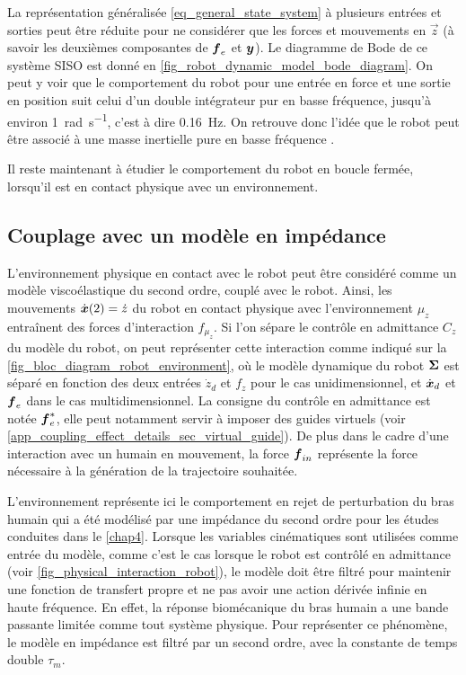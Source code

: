 La représentation généralisée \cref{eq_general_state_system} à plusieurs entrées et sorties peut être réduite pour ne considérer que les forces et mouvements en $\vec{z}$ (à savoir les deuxièmes composantes de $\vect{f}_e$ et $\vect{y}$). Le diagramme de Bode de ce système SISO est donné en \cref{fig_robot_dynamic_model_bode_diagram}. On peut y voir que le comportement du robot pour une entrée en force et une sortie en position suit celui d'un double intégrateur pur en basse fréquence, jusqu'à environ \SI{1}{\radian\per\second}, c'est à dire \SI{0.16}{\hertz}. On retrouve donc l'idée que le robot peut être associé à une masse inertielle pure en basse fréquence \parencite{lamy_conception_2011}.




Il reste maintenant à étudier le comportement du robot en boucle fermée, lorsqu'il est en contact physique avec un environnement.

\subsection{Couplage avec un modèle en impédance} \label{chap5_sec_model_sub_env}

L'environnement physique en contact avec le robot peut être considéré comme un modèle viscoélastique du second ordre, couplé avec le robot. Ainsi, les mouvements $\dot{\vect{x}}(2)=\dot{z}$ du robot en contact physique avec l'environnement $\mu_z$ entraînent des forces d'interaction $f_{\mu_z}$. Si l'on sépare le contrôle en admittance $C_z$ du modèle du robot, on peut représenter cette interaction comme indiqué sur la \cref{fig_bloc_diagram_robot_environment}, où le modèle dynamique du robot $\matr{\Sigma}$ est séparé en fonction des deux entrées $\dot{z}_d$ et $f_z$ pour le cas unidimensionnel, et $\dot{\vect{x}}_d$ et $\vect{f}_e$ dans le cas multidimensionnel. La consigne du contrôle en admittance est notée $\vect{f}_e^*$, elle peut notamment servir à imposer des guides virtuels (voir \cref{app_coupling_effect_details_sec_virtual_guide}). De plus dans le cadre d'une interaction avec un humain en mouvement, la force $\vect{f}_{in}$ représente la force nécessaire à la génération de la trajectoire souhaitée.

L'environnement représente ici le comportement en rejet de perturbation du bras humain qui a été modélisé par une impédance du second ordre pour les études conduites dans le \cref{chap4}. Lorsque les variables cinématiques sont utilisées comme entrée du modèle, comme c'est le cas lorsque le robot est contrôlé en admittance (voir \cref{fig_physical_interaction_robot}), le modèle doit être filtré pour maintenir une fonction de transfert propre et ne pas avoir une action dérivée infinie en haute fréquence. En effet, la réponse biomécanique du bras humain a une bande passante limitée comme tout système physique. Pour représenter ce phénomène, le modèle en impédance est filtré par un second ordre, avec la constante de temps double $\tau_m$.


